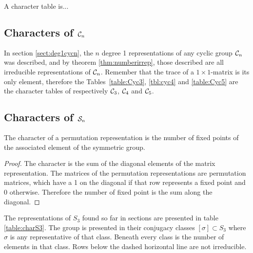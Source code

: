 \begin{definition}
	A character table is...
\end{definition}


\subsection{Characters of $\mathcal{C}_n$}

\begin{example}
	In section \ref{sect:deg1cycn}, the $n$ degree 1 representations of any cyclic group $\mathcal{C}_n$ was described, and by theorem \ref{thm:numberirrep}, those described are all irreducible representations of $\mathcal{C}_n$. Remember that the trace of a $1 \times 1$-matrix is its only element, therefore the Tables~\ref{table:Cyc3}, \ref{tbl:cyc4} and \ref{table:Cyc5} are the character tables of respectively $\mathcal{C}_3$, $\mathcal{C}_4$ and $\mathcal{C}_5$.
\end{example}

\subsection{Characters of $\mathcal{S}_n$}

\begin{theorem}
	The character of a permutation representation is the number of fixed points of the associated element of the symmetric group.
\end{theorem}
\begin{proof}
	The character is the sum of the diagonal elements of the matrix representation. The matrices of the permutation representations are permutation matrices, which have a 1 on the diagonal if that row represents a fixed point and 0 otherwise. Therefore the number of fixed point is the sum along the diagonal.
\end{proof}

The representations of $S_3$ found so far in sections 
are presented in table \ref{table:charS3}. The group is presented in their conjugacy classes $[\sigma] \subset S_3$ where $\sigma$ is any representative of that class. Beneath every class is the number of elements in that class. Rows below the dashed horizontal line are not irreducible.

